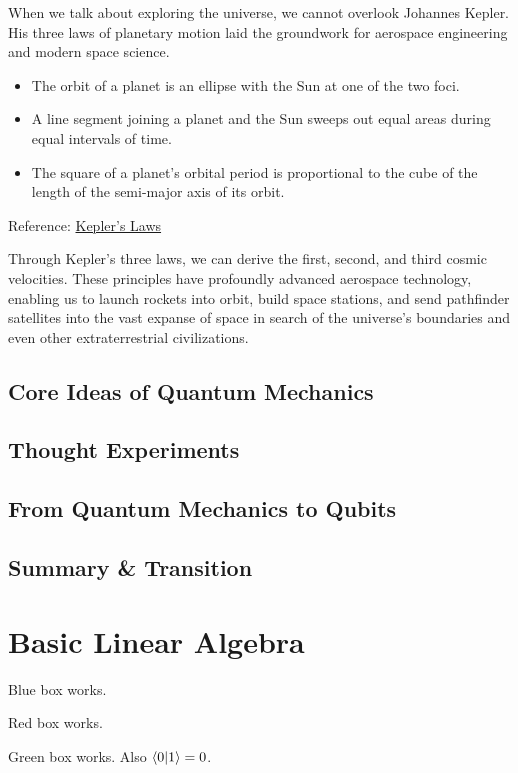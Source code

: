 \documentclass[12pt,oneside]{book}
\begin{document}
When we talk about exploring the universe, we cannot overlook Johannes Kepler. His three laws of planetary motion laid the groundwork for aerospace engineering and modern space science.
\begin{bluebox}
  \begin{itemize}
    \item The orbit of a planet is an ellipse with the Sun at one of the two foci.
    \item A line segment joining a planet and the Sun sweeps out equal areas during equal intervals of time.
    \item The square of a planet's orbital period is proportional to the cube of the length of the semi-major axis of its orbit.
  \end{itemize}
  Reference: \href{https://en.wikipedia.org/wiki/Kepler%27s_laws_of_planetary_motion}{Kepler's Laws}
\end{bluebox}
Through Kepler’s three laws, we can derive the first, second, and third cosmic velocities. These principles have profoundly advanced aerospace technology, enabling us to launch rockets into orbit, build space stations, and send pathfinder satellites into the vast expanse of space in search of the universe’s boundaries and even other extraterrestrial civilizations.
\section{Core Ideas of Quantum Mechanics}

\section{Thought Experiments}

\section{From Quantum Mechanics to Qubits}

\section{Summary \& Transition}

\chapter{Basic Linear Algebra}
\begin{bluebox}[Info]
Blue box works.
\end{bluebox}

\begin{redbox}[Warning]
Red box works.
\end{redbox}

\begin{greenbox}[Example]
Green box works. Also $\braket{0|1}=0$.
\end{greenbox}
\end{document}
